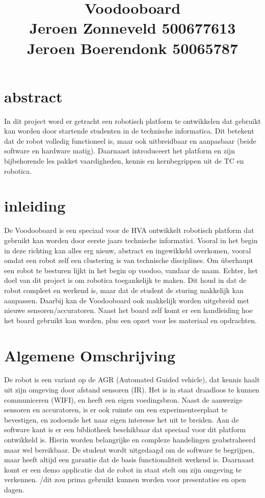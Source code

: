 \documentclass{article}
\begin{document}
\title{\textbf{Voodooboard}\\Jeroen Zonneveld 500677613\\Jeroen Boerendonk 50065787}
\maketitle
\section{abstract}
In dit project word er getracht een robotisch platform te ontwikkelen dat gebruikt kan worden door startende studenten in de technische informatica. Dit betekent dat de robot volledig functioneel is, maar ook uitbreidbaar en aanpasbaar (beide software en hardware matig). Daarnaast introduceert het platform en zijn bijbehorende les pakket vaardigheden, kennis en kernbegrippen uit de TC en robotica.
\section{inleiding}
De Voodooboard is een speciaal voor de HVA ontwikkelt robotisch platform dat gebruikt kan worden door eerste jaars technische informatici. Vooral in het begin in deze richting kan alles erg nieuw, abstract en ingewikkeld overkomen, vooral omdat een robot zelf een clustering is van technische disciplines. Om überhaupt een robot te besturen lijkt in het begin op voodoo, vandaar de naam. Echter, het doel van dit project is om robotica toegankelijk te maken. Dit houd in dat de robot  compleet en werkend is, maar dat de student de sturing makkelijk kan aanpassen. Daarbij kan de Voodooboard ook makkelijk worden uitgebreid met nieuwe sensoren/accuratoren. Naast het board zelf komt er een handleiding hoe het board gebruikt kan worden, plus een opzet voor les materiaal en opdrachten.
\section{Algemene Omschrijving}
De robot is een variant op de AGR (Automated Guided vehicle), dat kennis haalt uit zijn omgeving door afstand sensoren (IR). Het is in staat draadloos te kunnen communiceren  (WIFI), en heeft een eigen voedingsbron. Naast de aanwezige sensoren en accuratoren, is er ook ruimte om een experimenteerplaat te bevestigen, en zodoende het naar eigen interesse het uit te breiden. Aan de software kant is er een bibliotheek beschikbaar dat speciaal voor dit platform ontwikkeld is. Hierin worden belangrijke en complexe handelingen geabstraheerd maar wel bereikbaar. De student wordt uitgedaagd om de software te begrijpen, maar heeft altijd een garantie dat de basis functionaliteit werkend is. Daarnaast komt er een demo applicatie dat de robot in staat stelt om zijn omgeving te verkennen. /dit zou prima gebruikt kunnen worden voor presentaties en open dagen.
\end{document}
